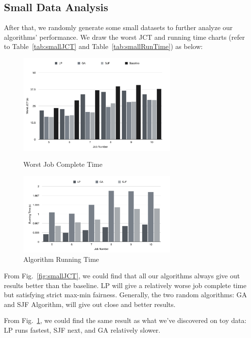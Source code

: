 \documentclass{llncs}
\begin{document}
\subsection{Small Data Analysis}
After that, we randomly generate some small datasets to further analyze our algorithms' performance. We draw the worst JCT and running time charts (refer to Table~\ref{tab:smallJCT} and Table~\ref{tab:smallRunTime}) as below:
\begin{figure}[htbp]
\centering
\begin{minipage}[t]{0.49\textwidth}
\centering
\includegraphics[width=8cm]{Figures/smallJCT.pdf}
\caption{Worst Job Complete Time}
\label{fig:smallJCT}
\end{minipage}
\begin{minipage}[t]{0.49\textwidth}
\centering
\includegraphics[width=8cm]{Figures/smallRunningTime.pdf}
\caption{Algorithm Running Time}
\label{fig:smallRunning}
\end{minipage}
\end{figure}

From Fig.~\ref{fig:smallJCT}, we could find that all our algorithms always give out results better than the baseline. LP will give a relatively worse job complete time but satisfying strict max-min fairness. Generally, the two random algorithms: GA and SJF Algorithm, will give out close and better results.

From Fig.~\ref{fig:smallRunning}, we could find the same result as what we've discovered on toy data: LP runs fastest, SJF next, and GA relatively slower. 
\end{document}
